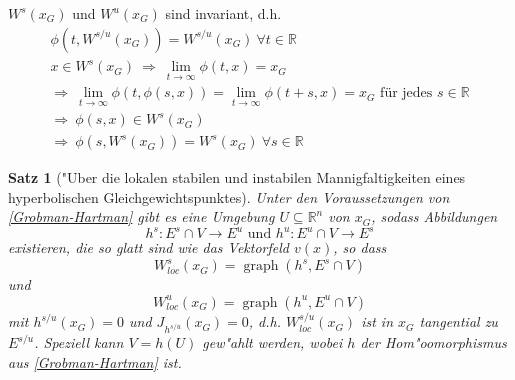 \documentclass[a4paper, 13pt]{scrreprt}
\newtheorem{satz}{Satz}[section]
\theoremstyle{definition} \newtheorem{definition}{Definition}[section]
\newenvironment{bemerkung}[1][Bemerkung]{\begin{trivlist}
\item[\hskip \labelsep {\bfseries #1}]}{\end{trivlist}}
\newcommand{\RR}{\mathbb{R}}
\begin{document}
\begin{bemerkung}
$W^s(x_G)$ und $W^u(x_G)$ sind invariant, d.h.
\begin{align*}
\phi(t,W^{s/u}(x_G))=W^{s/u}(x_G)\ \forall t\in\mathbb{R} \\
x\in W^s(x_G)\ \Rightarrow\ \lim_{t\to\infty}\phi(t,x)=x_G\\
\Rightarrow\ \lim_{t\to\infty}\phi(t,\phi(s,x))=\lim_{t\to\infty}\phi(t+s,x)=x_G \text{ für jedes }  s\in\mathbb{R}\\
\Rightarrow\ \phi(s,x)\in W^s(x_G)\\
\Rightarrow\ \phi(s,W^s(x_G))=W^s(x_G)\ \forall s\in\mathbb{R}
\end{align*}
\end{bemerkung}

\begin{satz}["Uber die lokalen stabilen und instabilen Mannigfaltigkeiten eines hyperbolischen Gleichgewichtspunktes]
Unter den Voraussetzungen von \eqref{Grobman-Hartman} gibt es eine Umgebung $U\subseteq \RR^n$ von $x_G$, sodass  Abbildungen
\[h^s:E^s\cap V\to E^u \text{ und } h^u:E^u\cap V\to E^s\]
existieren, die so glatt sind wie das Vektorfeld $v(x)$, so dass
\[W_{loc}^s(x_G)=\operatorname{graph}(h^s, E^s\cap V) \]und
\[W_{loc}^u(x_G)=\operatorname{graph}(h^u, E^u\cap V) \]
mit $h^{s/u}(x_G)=0$ und $J_{h^{s/u}}(x_G)=0$, d.h. $W_{loc}^{s/u}(x_G)$ ist in $x_G$ tangential zu $E^{s/u}$. Speziell kann $V = h(U)$ gew"ahlt werden, wobei $h$ der Hom"oomorphismus aus \eqref{Grobman-Hartman} ist.
\end{satz}
\end{document}

